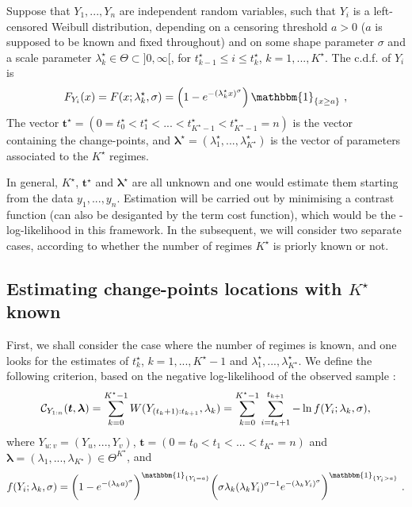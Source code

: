 \begin{definition}
Suppose that $Y_{1}, ..., Y_{n}$ are independent random variables, such that $Y_{i}$ is a left-censored Weibull distribution, depending on a censoring threshold $a>0$ ($a$ is supposed to be known and fixed throughout) and on some shape parameter $\sigma$ and a scale parameter $\lambda_{k}^{\star}\in \Theta\subset ]0,\infty[$, for $t_{k-1}^{\star}\le i \le t_{k}^{\star}$, $k =1,..., K^{\star}$. The c.d.f. of  $Y_{i}$ is
\begin{equation}\label{eq:cdf-censored}
   F_{Y_{i}}(x) =  F(x;\lambda_{k}^{\star},\sigma)  = \left( 1-e^{-(\lambda_{k}^{\star}x)^\sigma}\right)\mathbbm{1}_{\lbrace x \geq a\rbrace } \ , 
\end{equation}
The vector $\bm t^{\star} = (0=t^{\star}_{0}<t^{\star}_{1}<...<t^{\star}_{K^{\star}-1}<t^{\star}_{K^{\star}-1}=n)$ is the vector containing the change-points, and $\bm \lambda^{\star} = (\lambda_{1}^{\star}, ..., \lambda_{K^{\star}}^{\star})$ is the vector of parameters associated to the $K^{\star}$ regimes. 
\end{definition}

In general, $K^{\star}$, $\bm t^{\star} $ and $\bm \lambda^{\star}$ are all unknown and one would estimate them starting from the data $y_{1}, ..., y_{n}$. Estimation will be carried out by minimising a contrast function (can also be desiganted by the term cost function), which would be the -log-likelihood in this framework. In the subsequent, we will consider two separate cases, according to whether the number of regimes $K^{\star}$ is priorly known or not. 

\subsection{Estimating change-points locations with  \texorpdfstring{$K^{\star}$}{K*} known}

First, we shall consider the case where the number of regimes is known, and one looks for the estimates of $t^\star_{k}$, $k=1,...,K^{\star}-1$ and  $\lambda_{1}^\star, ..., \lambda_{K^{\star}}^{\star}$. We define the following criterion, based on the negative log-likelihood of the observed sample : 
\begin{equation}\label{eq:crit-known-k}
  {\mathcal C}_{Y_{1:n}}(\bm t, \bm \lambda ) = \sum_{k=0}^{K^{\star}-1}W(Y_{(t_{k}+1) : t_{k+1}}, \lambda_{k})  =  \sum_{k=0}^{K^{\star}-1} \sum_{i=t_{k}+1}^{t_{k+1}}-\ln f(Y_{i};\lambda_{k},\sigma) , 
\end{equation}
where $Y_{u:v}=(Y_{u},...,Y_{v})$, $\bm t=(0=t_{0}< t_{1}< ...< t_{K^{\star}}=n)$ and $\bm \lambda = (\lambda_{1}, ..., \lambda_{K^{\star}})\in \Theta^{K^{\star}}$, and 
\begin{equation}\label{eq:cens-dens}
  f(Y_{i};\lambda_{k},\sigma) = \bigg(1-e^{-(\lambda_{k}a)^\sigma}\bigg)^{\mathbbm{1}_{\lbrace Y_{i} = a\rbrace }} \bigg(\sigma\lambda_{k} (\lambda_{k}Y_i)^{\sigma-1} e^{-(\lambda_{k} Y_i)^\sigma}\bigg)^{\mathbbm{1}_{\lbrace Y_{i} > a\rbrace}} \ .
\end{equation}

